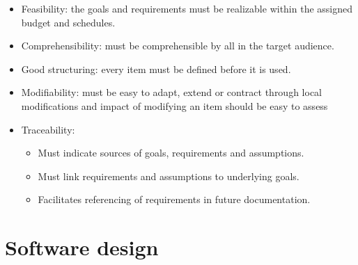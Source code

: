 \documentclass[12pt, a4paper]{report}
\begin{document}
\begin{itemize}
            \item Feasibility: the goals and requirements must be realizable within the assigned budget and schedules. 
            \item Comprehensibility: must be comprehensible by all in the target audience.
            \item Good structuring: every item must be defined before it is used.
            \item Modifiability: must be easy to adapt, extend or contract through local modifications and impact of modifying an item should be easy to assess
            \item Traceability: 
            \begin{itemize}
                \item Must indicate sources of goals, requirements and assumptions. 
                \item Must link requirements and assumptions to underlying goals.
                \item Facilitates referencing of requirements in future documentation.
            \end{itemize}
        \end{itemize}   

        \newpage 
        
        \chapter{Software design}
\end{document}

